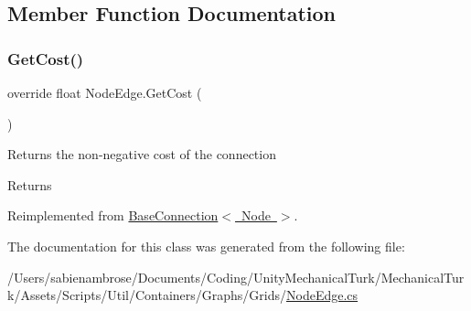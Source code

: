 \subsection{Member Function Documentation}
\mbox{\label{class_node_edge_aa2eb53bd74c21ecc54af55568af1b6cc}} 
\subsubsection{\texorpdfstring{Get\+Cost()}{GetCost()}}
{\footnotesize\ttfamily override float Node\+Edge.\+Get\+Cost (\begin{DoxyParamCaption}{ }\end{DoxyParamCaption})\hspace{0.3cm}{\ttfamily [virtual]}}



Returns the non-\/negative cost of the connection 

\begin{DoxyReturn}{Returns}

\end{DoxyReturn}


Reimplemented from \mbox{\hyperlink{class_base_connection_a3f2351e9bf997450cca8f64e1e32337a}{Base\+Connection$<$ Node $>$}}.



The documentation for this class was generated from the following file\+:\begin{DoxyCompactItemize}
\item 
/\+Users/sabienambrose/\+Documents/\+Coding/\+Unity\+Mechanical\+Turk/\+Mechanical\+Turk/\+Assets/\+Scripts/\+Util/\+Containers/\+Graphs/\+Grids/\mbox{\hyperlink{_node_edge_8cs}{Node\+Edge.\+cs}}\end{DoxyCompactItemize}
